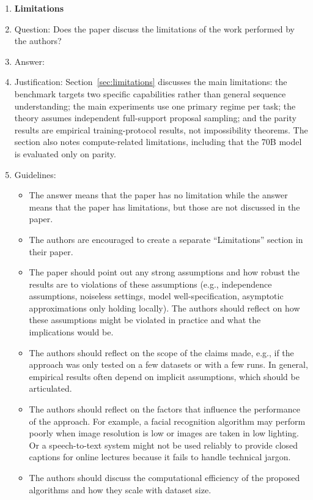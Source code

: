 \documentclass{article}
\theoremstyle{plain}
\theoremstyle{definition}
\theoremstyle{remark}
\begin{document}
\begin{enumerate}
\item {\bf Limitations}
    \item[] Question: Does the paper discuss the limitations of the work performed by the authors?
    \item[] Answer: \answerYes{}
    \item[] Justification: Section~\ref{sec:limitations} discusses the main limitations: the benchmark targets two specific capabilities rather than general sequence understanding; the main experiments use one primary regime per task; the theory assumes independent full-support proposal sampling; and the parity results are empirical training-protocol results, not impossibility theorems. The section also notes compute-related limitations, including that the 70B model is evaluated only on parity.
    \item[] Guidelines:
    \begin{itemize}
        \item The answer \answerNA{} means that the paper has no limitation while the answer \answerNo{} means that the paper has limitations, but those are not discussed in the paper. 
        \item The authors are encouraged to create a separate ``Limitations'' section in their paper.
        \item The paper should point out any strong assumptions and how robust the results are to violations of these assumptions (e.g., independence assumptions, noiseless settings, model well-specification, asymptotic approximations only holding locally). The authors should reflect on how these assumptions might be violated in practice and what the implications would be.
        \item The authors should reflect on the scope of the claims made, e.g., if the approach was only tested on a few datasets or with a few runs. In general, empirical results often depend on implicit assumptions, which should be articulated.
        \item The authors should reflect on the factors that influence the performance of the approach. For example, a facial recognition algorithm may perform poorly when image resolution is low or images are taken in low lighting. Or a speech-to-text system might not be used reliably to provide closed captions for online lectures because it fails to handle technical jargon.
        \item The authors should discuss the computational efficiency of the proposed algorithms and how they scale with dataset size.

\end{itemize}
\end{enumerate}
\end{document}
